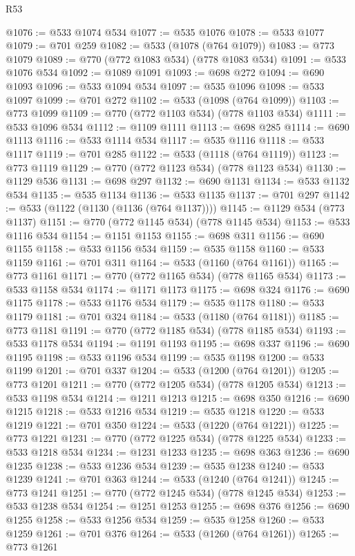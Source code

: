 \begin{lexlean}{R53}
\begin{coremodule}
@1076 := @533 @1074 @534
@1077 := @535 @1076
@1078 := @533 @1077
@1079 := @701 @259
@1082 := @533 (@1078 (@764 @1079))
@1083 := @773 @1079
@1089 := @770 (@772 @1083 @534) (@778 @1083 @534)
@1091 := @533 @1076 @534
@1092 := @1089 @1091
@1093 := @698 @272
@1094 := @690 @1093
@1096 := @533 @1094 @534
@1097 := @535 @1096
@1098 := @533 @1097
@1099 := @701 @272
@1102 := @533 (@1098 (@764 @1099))
@1103 := @773 @1099
@1109 := @770 (@772 @1103 @534) (@778 @1103 @534)
@1111 := @533 @1096 @534
@1112 := @1109 @1111
@1113 := @698 @285
@1114 := @690 @1113
@1116 := @533 @1114 @534
@1117 := @535 @1116
@1118 := @533 @1117
@1119 := @701 @285
@1122 := @533 (@1118 (@764 @1119))
@1123 := @773 @1119
@1129 := @770 (@772 @1123 @534) (@778 @1123 @534)
@1130 := @1129 @536
@1131 := @698 @297
@1132 := @690 @1131
@1134 := @533 @1132 @534
@1135 := @535 @1134
@1136 := @533 @1135
@1137 := @701 @297
@1142 := @533 (@1122 (@1130 (@1136 (@764 @1137))))
@1145 := @1129 @534 (@773 @1137)
@1151 := @770 (@772 @1145 @534) (@778 @1145 @534)
@1153 := @533 @1116 @534
@1154 := @1151 @1153
@1155 := @698 @311
@1156 := @690 @1155
@1158 := @533 @1156 @534
@1159 := @535 @1158
@1160 := @533 @1159
@1161 := @701 @311
@1164 := @533 (@1160 (@764 @1161))
@1165 := @773 @1161
@1171 := @770 (@772 @1165 @534) (@778 @1165 @534)
@1173 := @533 @1158 @534
@1174 := @1171 @1173
@1175 := @698 @324
@1176 := @690 @1175
@1178 := @533 @1176 @534
@1179 := @535 @1178
@1180 := @533 @1179
@1181 := @701 @324
@1184 := @533 (@1180 (@764 @1181))
@1185 := @773 @1181
@1191 := @770 (@772 @1185 @534) (@778 @1185 @534)
@1193 := @533 @1178 @534
@1194 := @1191 @1193
@1195 := @698 @337
@1196 := @690 @1195
@1198 := @533 @1196 @534
@1199 := @535 @1198
@1200 := @533 @1199
@1201 := @701 @337
@1204 := @533 (@1200 (@764 @1201))
@1205 := @773 @1201
@1211 := @770 (@772 @1205 @534) (@778 @1205 @534)
@1213 := @533 @1198 @534
@1214 := @1211 @1213
@1215 := @698 @350
@1216 := @690 @1215
@1218 := @533 @1216 @534
@1219 := @535 @1218
@1220 := @533 @1219
@1221 := @701 @350
@1224 := @533 (@1220 (@764 @1221))
@1225 := @773 @1221
@1231 := @770 (@772 @1225 @534) (@778 @1225 @534)
@1233 := @533 @1218 @534
@1234 := @1231 @1233
@1235 := @698 @363
@1236 := @690 @1235
@1238 := @533 @1236 @534
@1239 := @535 @1238
@1240 := @533 @1239
@1241 := @701 @363
@1244 := @533 (@1240 (@764 @1241))
@1245 := @773 @1241
@1251 := @770 (@772 @1245 @534) (@778 @1245 @534)
@1253 := @533 @1238 @534
@1254 := @1251 @1253
@1255 := @698 @376
@1256 := @690 @1255
@1258 := @533 @1256 @534
@1259 := @535 @1258
@1260 := @533 @1259
@1261 := @701 @376
@1264 := @533 (@1260 (@764 @1261))
@1265 := @773 @1261

\end{coremodule}
\end{lexlean}
